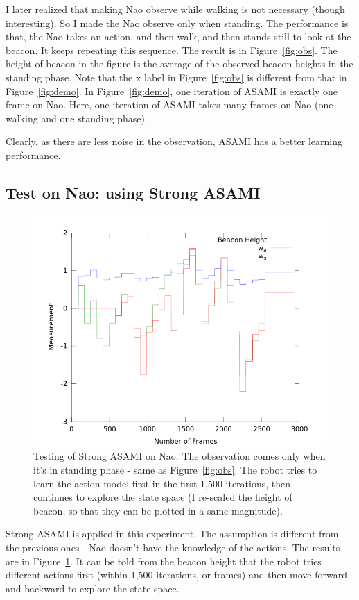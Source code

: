 \documentclass[10pt]{article}
\begin{document}
I later realized that making Nao observe while walking is not
necessary (though interesting). So I made the Nao observe only when
standing.  The performance is that, the Nao takes an action, and then
walk, and then stands still to look at the beacon. It keeps repeating
this sequence. The result is in Figure~\ref{fig:obs}.  The height of
beacon in the figure is the average of the observed beacon heights in
the standing phase. Note that the x label in Figure~\ref{fig:obs} is
different from that in Figure~\ref{fig:demo}. In Figure~\ref{fig:demo},
one iteration of ASAMI is exactly one frame on Nao. Here, one
iteration of ASAMI takes many frames on Nao (one walking and one
standing phase).

Clearly, as there are less noise in the observation, ASAMI has a
better learning performance.

\subsection{Test on Nao: using Strong ASAMI}

\begin{figure}[h]
\centering
\includegraphics[width=0.7\columnwidth]{out_strong.png}
\caption{Testing of Strong ASAMI on Nao. The observation comes only
when it's in standing phase - same as Figure~\ref{fig:obs}. The robot
tries to learn the action model first in the first 1,500 iterations,
then continues to explore the state space (I re-scaled the height of
beacon, so that they can be plotted in a same magnitude).}
\label{fig:obs_strong}
\end{figure}

Strong ASAMI is applied in this experiment. The assumption is
different from the previous ones - Nao doesn't have the knowledge of
the actions. The results are in Figure~\ref{fig:obs_strong}. It can be
told from the beacon height that the robot tries different actions
first (within 1,500 iterations, or frames) and then move forward and
backward to explore the state space.
\end{document}
